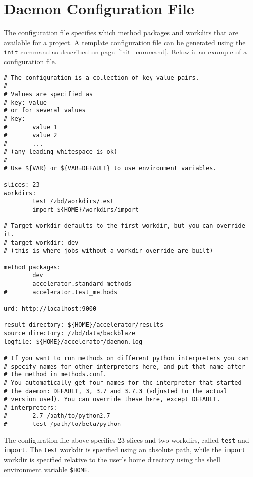 \section{Daemon Configuration File}
\label{sec:configfile}
The configuration file specifies which method packages and workdirs
that are available for a project.  A template configuration file can
be generated using the \texttt{init} command as described on
page~\ref{init_command}.  Below is an example of a configuration file.
\begin{snugshade}
\begin{verbatim}
# The configuration is a collection of key value pairs.
#
# Values are specified as
# key: value
# or for several values
# key:
#       value 1
#       value 2
#       ...
# (any leading whitespace is ok)
#
# Use ${VAR} or ${VAR=DEFAULT} to use environment variables.

slices: 23
workdirs:
        test /zbd/workdirs/test
        import ${HOME}/workdirs/import

# Target workdir defaults to the first workdir, but you can override it.
# target workdir: dev
# (this is where jobs without a workdir override are built)

method packages:
        dev
        accelerator.standard_methods
#       accelerator.test_methods   

urd: http://localhost:9000

result directory: ${HOME}/accelerator/results
source directory: /zbd/data/backblaze
logfile: ${HOME}/accelerator/daemon.log

# If you want to run methods on different python interpreters you can
# specify names for other interpreters here, and put that name after
# the method in methods.conf.
# You automatically get four names for the interpreter that started
# the daemon: DEFAULT, 3, 3.7 and 3.7.3 (adjusted to the actual
# version used). You can override these here, except DEFAULT.
# interpreters:
#       2.7 /path/to/python2.7
#       test /path/to/beta/python  
\end{verbatim}
\end{snugshade}%

The configuration file above specifies 23 slices and two workdirs,
called \texttt{test} and \texttt{import}.  The \texttt{test} workdir
is specified using an absolute path, while the \texttt{import} workdir
is specified relative to the user's home directory using the shell
environment variable \texttt{\$HOME}.

